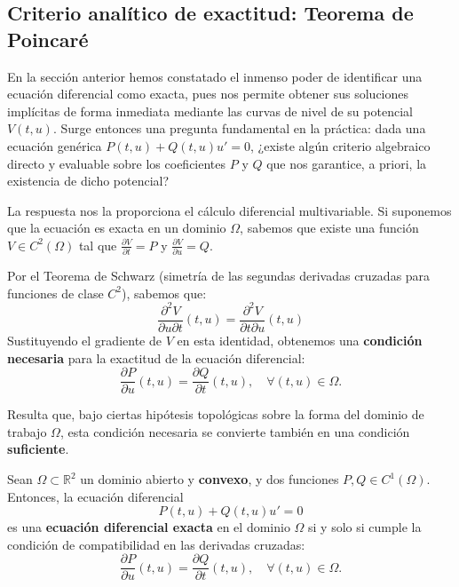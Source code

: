 \subsection{Criterio analítico de exactitud: Teorema de Poincaré}

En la sección anterior hemos constatado el inmenso poder de identificar una ecuación diferencial como exacta, pues nos permite obtener sus soluciones implícitas de forma inmediata mediante las curvas de nivel de su potencial $V(t,u)$. Surge entonces una pregunta fundamental en la práctica: dada una ecuación genérica $P(t,u) + Q(t,u)u' = 0$, ¿existe algún criterio algebraico directo y evaluable sobre los coeficientes $P$ y $Q$ que nos garantice, a priori, la existencia de dicho potencial?

La respuesta nos la proporciona el cálculo diferencial multivariable. Si suponemos que la ecuación es exacta en un dominio $\Omega$, sabemos que existe una función $V \in C^2(\Omega)$ tal que $\frac{\partial V}{\partial t} = P$ y $\frac{\partial V}{\partial u} = Q$. 

Por el Teorema de Schwarz (simetría de las segundas derivadas cruzadas para funciones de clase $C^2$), sabemos que:
\[
    \frac{\partial^2 V}{\partial u \partial t}(t,u) = \frac{\partial^2 V}{\partial t \partial u}(t,u)
\]
Sustituyendo el gradiente de $V$ en esta identidad, obtenemos una \textbf{condición necesaria} para la exactitud de la ecuación diferencial:
\[
    \frac{\partial P}{\partial u}(t,u) = \frac{\partial Q}{\partial t}(t,u), \quad \forall (t,u) \in \Omega.
\]

Resulta que, bajo ciertas hipótesis topológicas sobre la forma del dominio de trabajo $\Omega$, esta condición necesaria se convierte también en una condición \textbf{suficiente}.

\begin{teorema}
    Sean $\Omega \subset \mathbb{R}^2$ un dominio abierto y \textbf{convexo}, y dos funciones $P, Q \in C^1(\Omega)$. Entonces, la ecuación diferencial
    \[
        P(t,u) + Q(t,u)u' = 0
    \]
    es una \textbf{ecuación diferencial exacta} en el dominio $\Omega$ si y solo si cumple la condición de compatibilidad en las derivadas cruzadas:
    \[
        \frac{\partial P}{\partial u}(t,u) = \frac{\partial Q}{\partial t}(t,u), \quad \forall (t,u) \in \Omega.
    \]
\end{teorema}


